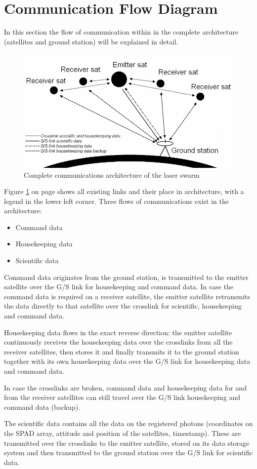 \section{Communication Flow Diagram}

In this section the flow of communication within in the complete architecture (satellites and ground station) will be explained in detail.
\begin{figure}[ht]
\centering
\includegraphics[width=1.0\textwidth, angle=0]{chapters/img/allesZW.png}
\caption{Complete communications architecture of the laser swarm}
\label{fig:allesZWW}
\end{figure}

Figure \ref{fig:allesZWW} on page \pageref{fig:allesZWW} shows all existing links and their place in architecture, with a legend in the lower left corner.
Three flows of communications exist in the architecture:
\begin{itemize}
\item Command data
\item Housekeeping data
\item Scientific data
\end{itemize}

Command data originates from the ground station, is transmitted to the emitter satellite over the G/S link for housekeeping and command data. In case the command data is required on a receiver satellite, the emitter satellite retransmits the data directly to that satellite over the crosslink for scientific, housekeeping and command data.

Housekeeping data flows in the exact reverse direction: the emitter satellite continuously receives the housekeeping data over the crosslinks from all the receiver satellites, then stores it and finally transmits it to the ground station together with its own housekeeping data over the G/S link for housekeeping data and command data.

In case the crosslinks are broken, command data and housekeeping data for and from the receiver satellites can still travel over the G/S link housekeeping and command data (backup).

The scientific data contains all the data on the registered photons (coordinates on the SPAD array, attitude and position of the satellites, timestamp). These are transmitted over the crosslinks to the emitter satellite, stored on its data storage system and then transmitted to the ground station over the G/S link for scientific data.
